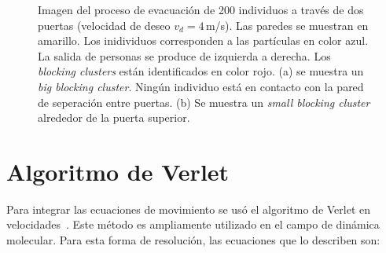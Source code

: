 \begin{figure}[H]
    \centering
    \hfill
    \caption[width=5cm]{Imagen del proceso de evacuación de  200 individuos a través de dos puertas (velocidad de deseo $v_d=4\,$m/s). Las paredes se muestran en amarillo. Los inidividuos corresponden a las partículas en color azul. La salida de personas se produce de izquierda a derecha. Los \textit{blocking clusters} están identificados en color rojo. (a) se muestra un \textit{big blocking cluster}. Ningún individuo está en contacto con la pared de seperación entre puertas. (b)  Se muestra un \textit{small blocking cluster} alrededor de la puerta superior.}
    \label{bc}
\end{figure}


\section{\label{verlet} Algoritmo de Verlet}

Para integrar las ecuaciones de movimiento se usó el algoritmo de Verlet en velocidades~\cite{haile}. Este método es ampliamente utilizado en el campo de dinámica molecular. Para esta forma de resolución, las ecuaciones que lo describen son:

